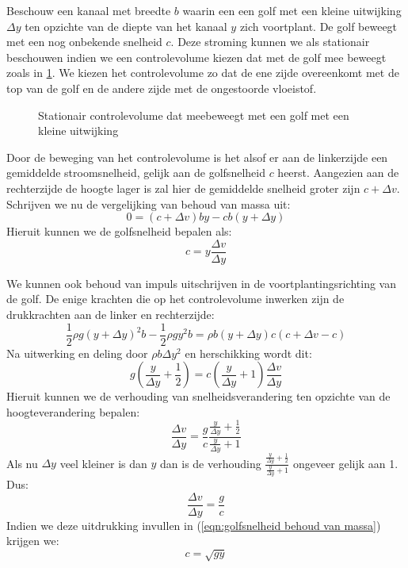 Beschouw een kanaal met breedte $b$  waarin een een golf met een kleine uitwijking $\Delta y$ ten opzichte van de diepte van het kanaal $y$ zich voortplant. De golf beweegt met een nog onbekende snelheid $c$. Deze stroming kunnen we als stationair beschouwen indien we een controlevolume kiezen dat met de golf mee beweegt zoals in \ref{fig:Golfsnelheid}. We kiezen het controlevolume zo dat de ene zijde overeenkomt met de top van de golf en de andere zijde met de ongestoorde vloeistof.
\begin{figure}[htb]
	\centering
	
	\caption{Stationair controlevolume dat meebeweegt met een golf met een kleine uitwijking}
	\label{fig:Golfsnelheid}
\end{figure}
Door de beweging van het controlevolume is het alsof er aan de linkerzijde een gemiddelde stroomsnelheid, gelijk aan de golfsnelheid $c$ heerst. Aangezien aan de rechterzijde de hoogte lager is zal hier de gemiddelde snelheid groter zijn $c+\Delta v$. Schrijven we nu de vergelijking van behoud van massa uit:
\begin{equation}
	0 = (c+\Delta v) b y - c b (y+\Delta y)
\end{equation}
Hieruit kunnen we de golfsnelheid bepalen als:
\begin{equation}
	c = y \frac{\Delta v}{\Delta y}
	\label{eqn:golfsnelheid behoud van massa}
\end{equation}

We kunnen ook behoud van impuls uitschrijven in de voortplantingsrichting van de golf. De enige krachten die op het controlevolume inwerken zijn de drukkrachten aan de linker en rechterzijde:
\begin{equation}
	\frac{1}{2}\rho g (y+\Delta y)^2 b - \frac{1}{2}\rho g y^2 b = \rho b (y+\Delta y) c (c+\Delta v-c)
\end{equation}
Na uitwerking en deling door $\rho b \Delta y^2$ en herschikking wordt dit:
\begin{equation}
	 g \left(\frac{y}{\Delta y} + \frac{1}{2}\right)  = c \left(\frac{y}{\Delta y} + 1\right)\frac{\Delta v}{\Delta y}
\end{equation}
Hieruit kunnen we de verhouding van snelheidsverandering ten opzichte van de hoogteverandering bepalen:
\begin{equation}
	\frac{\Delta v}{\Delta y} = \frac{g}{c} \frac{\frac{y}{\Delta y} + \frac{1}{2}}{\frac{y}{\Delta y} + 1}
\end{equation}
Als nu $\Delta y$ veel kleiner is dan $y$ dan is de verhouding $\frac{\frac{y}{\Delta y} + \frac{1}{2}}{\frac{y}{\Delta y} + 1}$ ongeveer gelijk aan 1. Dus:
\begin{equation}
	\frac{\Delta v}{\Delta y} = \frac{g}{c}
\end{equation}
Indien we deze uitdrukking invullen in (\ref{eqn:golfsnelheid behoud van massa}) krijgen we:
\begin{equation}
	c = \sqrt{g y}
	\label{eqn:golfsnelheid ondiep}
\end{equation}

